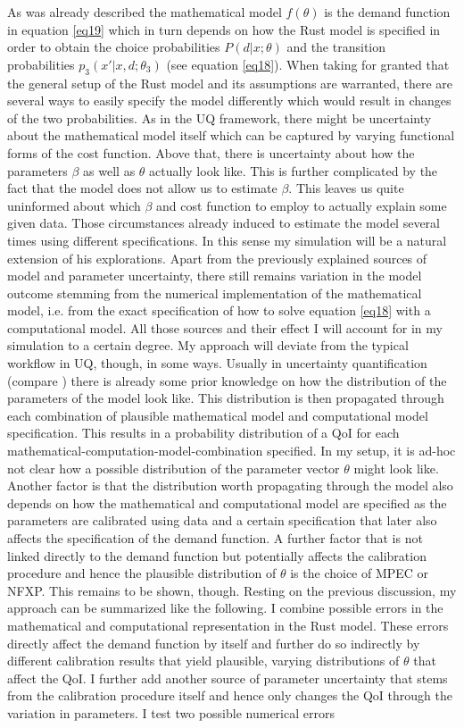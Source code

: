 As was already described the mathematical model $f(\theta)$ is the demand function in equation \ref{eq19} which in turn depends on how the Rust model is specified in order to obtain the choice probabilities $P(d|x; \theta)$ and the transition probabilities $p_3(x'|x, d; \theta_3)$ (see equation \ref{eq18}). When taking for granted that the general setup of the Rust model and its assumptions are warranted, there are several ways to easily specify the model differently which would result in changes of the two probabilities. As in the UQ framework, there might be uncertainty about the mathematical model itself which can be captured by varying functional forms of the cost function. Above that, there is uncertainty about how the parameters $\beta$ as well as $\theta$ actually look like. This is further complicated by the fact that the model does not allow us to estimate $\beta$. This leaves us quite uninformed about which $\beta$ and cost function to employ to actually explain some given data. Those circumstances already induced \cite{Rust.1987} to estimate the model several times using different specifications. In this sense my simulation will be a natural extension of his explorations. Apart from the previously explained sources of model and parameter uncertainty, there still remains variation in the model outcome stemming from the numerical implementation of the mathematical model, i.e. from the exact specification of how to solve equation \ref{eq18} with a computational model. All those sources and their effect I will account for in my simulation to a certain degree. My approach will deviate from the typical workflow in UQ, though, in some ways. Usually in uncertainty quantification (compare \cite{Smith.2013, Oberkampf.2010}) there is already some prior knowledge on how the distribution of the parameters of the model look like. This distribution is then propagated through each combination of plausible mathematical model and computational model specification. This results in a probability distribution of a QoI for each mathematical-computation-model-combination specified. In my setup, it is ad-hoc not clear how a possible distribution of the parameter vector $\theta$ might look like. Another factor is that the distribution worth propagating through the model also depends on how the mathematical and computational model are specified as the parameters are calibrated using data and a certain specification that later also affects the specification of the demand function. A further factor that is not linked directly to the demand function but potentially affects the calibration procedure and hence the plausible distribution of $\theta$ is the choice of MPEC or NFXP. This remains to be shown, though. Resting on the previous discussion, my approach can be summarized like the following. I combine possible errors in the mathematical and computational representation in the Rust model. These errors directly affect the demand function by itself and further do so indirectly by different calibration results that yield plausible, varying distributions of $\theta$ that affect the QoI. I further add another source of parameter uncertainty that stems from the calibration procedure itself and hence only changes the QoI through the variation in parameters. I test two possible numerical errors 